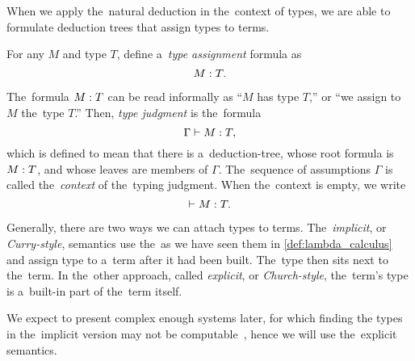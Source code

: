 
When we apply the~natural deduction in the~context of types, we are able to
formulate deduction trees that assign types to terms.

\begin{definition}
  For any \lt $M$ and type $T$, define a~\emph{type assignment} formula as
  \[
    M \overset{}: T.
  \]
\end{definition}

The~formula $M \overset{}: T$ can be read informally as ``$M$ has type $T$,'' or ``we
assign to $M$ the~type $T$.'' Then, \emph{type judgment} is the~formula
\[
  \Gamma \vdash M \overset{}: T,
\]
which is defined to mean that there is a~deduction-tree, whose root formula is
$M \overset{}: T$, and whose leaves are members of $\Gamma$. The~sequence of
assumptions $\Gamma$ is called the~\emph{context} of the~typing judgment. When
the~context is empty, we write
\[
  \vdash M \overset{}: T.
\]

\label{sec:stlc}

Generally, there are two ways we can attach types to terms. The~\emph{implicit},
or \emph{Curry-style}, semantics use the~\lts as we have seen them in
\autoref{def:lambda_calculus} and assign type to a~term after it had been built.
The~type then sits next to the~term. In the~other approach, called
\emph{explicit}, or \emph{Church-style}, the~term's type is a~built-in part of
the~term itself.

We expect to present complex enough systems later, for which finding the types
in the~implicit version may not be computable~\citep{wells_1999}, hence we will
use the~explicit semantics.

